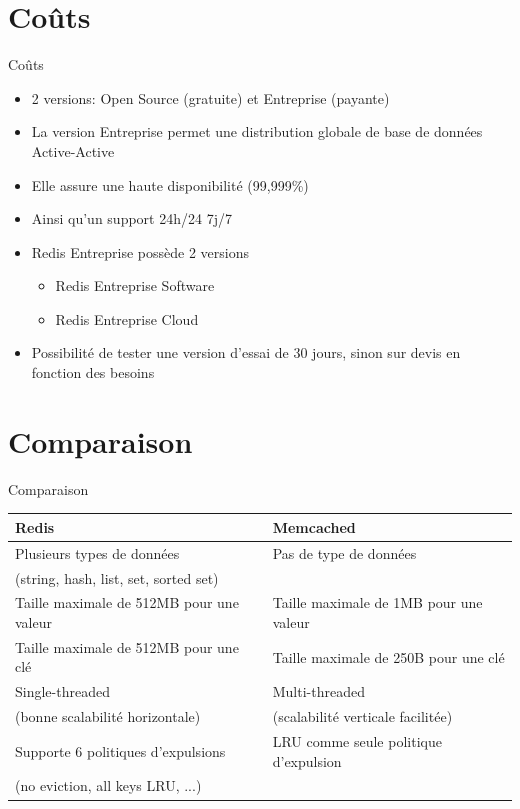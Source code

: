 \documentclass[aspectratio=169]{beamer}
\begin{document}
\section{Coûts}
\begin{frame}{Coûts}
\begin{center}

\begin{itemize}
    \item 2 versions: Open Source (gratuite) et Entreprise (payante)
    \item La version Entreprise permet une distribution globale de base de données Active-Active
    \item Elle assure une haute disponibilité (99,999\%)
    \item Ainsi qu'un support 24h/24 7j/7
    \item Redis Entreprise possède 2 versions
    \begin{itemize}
    \item Redis Entreprise Software
    \item Redis Entreprise Cloud
    \end{itemize}
    \item Possibilité de tester une version d'essai de 30 jours, sinon sur devis en fonction des besoins
\end{itemize}
\end{center}
\end{frame}

\section{Comparaison}
\begin{frame}{Comparaison}
 \begin{center}\small
  \begin{tabular}{|l|l|}
     \hline
      \textbf{Redis} & \textbf{Memcached} \\
     \hline
     \hline
        Plusieurs types de données & Pas de type de données  \\
        (string, hash, list, set, sorted set) & \\
     \hline
     Taille maximale de 512MB pour une valeur & Taille maximale de 1MB pour une valeur \\
     \hline
     Taille maximale de 512MB pour une clé  & Taille maximale de 250B pour une clé \\ 
     \hline
     Single-threaded & Multi-threaded \\
     (bonne scalabilité horizontale) & (scalabilité verticale facilitée) \\
     \hline
    Supporte 6 politiques d'expulsions & LRU comme seule politique d'expulsion  \\
     (no eviction, all keys LRU, ...) & \\
     \hline
     \end{tabular}
 \end{center}
\end{frame}
\end{document}
